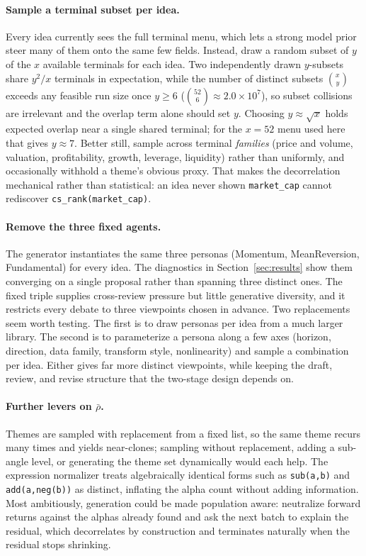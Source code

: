 \documentclass{article}
\theoremstyle{definition}
\theoremstyle{plain}
\theoremstyle{remark}
\begin{document}
\paragraph{Sample a terminal subset per idea.} Every idea currently sees the full terminal
menu, which lets a strong model prior steer many of them onto the same few fields.
Instead, draw a random subset of $y$ of the $x$ available terminals for each idea. Two
independently drawn $y$-subsets share $y^2/x$ terminals in expectation, while the number
of distinct subsets $\binom{x}{y}$ exceeds any feasible run size once $y\ge6$
($\binom{52}{6}\approx2.0\times10^{7}$), so subset collisions are irrelevant and the
overlap term alone should set $y$. Choosing $y\approx\sqrt{x}$ holds expected overlap near
a single shared terminal; for the $x=52$ menu used here that gives $y\approx7$. Better
still, sample across terminal \emph{families} (price and volume, valuation, profitability,
growth, leverage, liquidity) rather than uniformly, and occasionally withhold a theme's
obvious proxy. That makes the decorrelation mechanical rather than statistical: an idea
never shown \texttt{market\_cap} cannot rediscover \texttt{cs\_rank(market\_cap)}.

\paragraph{Remove the three fixed agents.} The generator instantiates the same three
personas (Momentum, MeanReversion, Fundamental) for every idea. The diagnostics in
Section~\ref{sec:results} show them converging on a single proposal rather than spanning
three distinct ones. The fixed triple supplies cross-review pressure but little
generative diversity, and it restricts every debate to three viewpoints chosen in
advance. Two replacements seem worth testing. The first is to draw personas per idea from
a much larger library. The second is to parameterize a persona along a few axes (horizon,
direction, data family, transform style, nonlinearity) and sample a combination per idea.
Either gives far more distinct viewpoints, while keeping the draft, review, and revise
structure that the two-stage design depends on.

\paragraph{Further levers on $\bar\rho$.} Themes are sampled with replacement from a fixed
list, so the same theme recurs many times and yields near-clones; sampling without
replacement, adding a sub-angle level, or generating the theme set dynamically would each
help. The expression normalizer treats algebraically identical forms such as
\texttt{sub(a,b)} and \texttt{add(a,neg(b))} as distinct, inflating the alpha count
without adding information. Most ambitiously, generation could be made population aware:
neutralize forward returns against the alphas already found and ask the next batch to
explain the residual, which decorrelates by construction and terminates naturally when the
residual stops shrinking.
\end{document}
